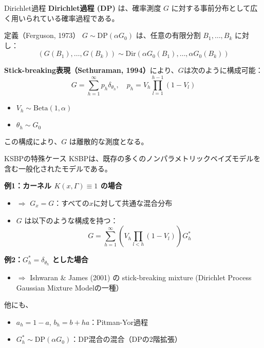 \documentclass[xelatex, 8pt]{beamer}
\theoremstyle{plain}
\theoremstyle{definition}
\begin{document}
\begin{frame}{Dirichlet過程}
\textbf{Dirichlet過程 (DP)} は、確率測度 $G$ に対する事前分布として広く用いられている確率過程である。

\begin{block}{定義（Ferguson, 1973）}
$G \sim \mathrm{DP}(\alpha G_0)$ は、任意の有限分割 $B_1, \dots, B_k$ に対し：
\[
(G(B_1), \dots, G(B_k)) \sim \mathrm{Dir}(\alpha G_0(B_1), \dots, \alpha G_0(B_k))
\]
\end{block}

\vspace{1em}
\textbf{Stick-breaking表現（Sethuraman, 1994）}により、$G$は次のように構成可能：
\[
G = \sum_{h=1}^\infty p_h \delta_{\theta_h}, \quad
p_h = V_h \prod_{l=1}^{h-1}(1 - V_l)
\]
\begin{itemize}
    \item $V_h \sim \mathrm{Beta}(1, \alpha)$
    \item $\theta_h \sim G_0$
\end{itemize}

この構成により、$G$ は離散的な測度となる。
\end{frame}



\begin{frame}{KSBPの特殊ケース}
KSBPは、既存の多くのノンパラメトリックベイズモデルを含む一般化されたモデルである。

\vspace{1em}
\textbf{例1：カーネル $K(x, \Gamma) \equiv 1$ の場合}
\begin{itemize}
    \item $\Rightarrow$ $G_x = G$：すべての$x$に対して共通な混合分布
    \item $G$ は以下のような構成を持つ：
    \[
    G = \sum_{h=1}^\infty \left( V_h \prod_{l < h} (1 - V_l) \right) G_h^*
    \]
\end{itemize}

\vspace{1em}
\textbf{例2：$G_h^* = \delta_{\theta_h}$ とした場合}
\begin{itemize}
    \item $\Rightarrow$ Ishwaran & James (2001) の stick-breaking mixture (Dirichlet Process Gaussian Mixture Modelの一種）
\end{itemize}

\vspace{1em}
他にも、
\begin{itemize}
    \item $a_h = 1 - a$, $b_h = b + h a$：Pitman-Yor過程
    \item $G_h^* \sim \mathrm{DP}(\alpha G_0)$：DP混合の混合（DPの2階拡張）
\end{itemize}
\end{frame}
\end{document}
